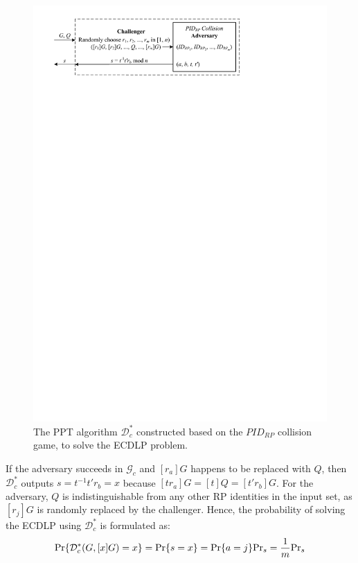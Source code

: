\begin{figure}[tb]
  \centering
  \includegraphics[width=0.97\linewidth]{fig/ecdlp_algorithm.pdf}
  \caption{The PPT algorithm $\mathcal{D}^*_c$ constructed based on the $PID_{RP}$ collision game, to solve the ECDLP problem.}
  \label{fig:ecdlp_algorithm}
\end{figure}

If the adversary succeeds in $\mathcal{G}_c$ and $[r_a]G$ happens to be replaced with $Q$,
  then $\mathcal{D}^*_c$ outputs $s=t^{-1}t'r_b =x$ because $[tr_a]G = [t]Q = [t'r_b]G$. For the adversary, $Q$ is indistinguishable from any other RP identities in the input set, as $[r_j]G$ is randomly replaced by the challenger.
Hence, the probability of solving the ECDLP using $\mathcal{D}^*_c$ is formulated as:
\begin{equation*}
{\rm Pr}\{\mathcal{D}^*_c(G, [x]G)=x\} = {\rm Pr}\{s = x\}={\rm Pr}\{a=j\}{\rm Pr}_s=\frac{1}{m}{\rm Pr}_s
\end{equation*}

